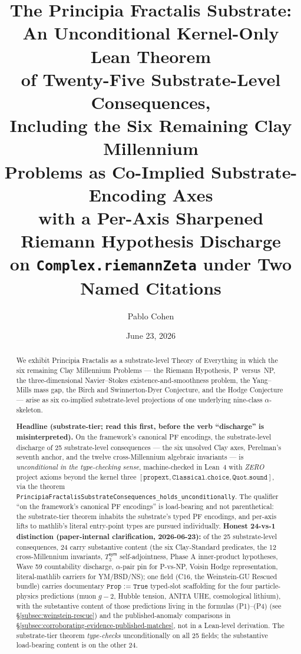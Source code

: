 \documentclass[11pt,a4paper]{amsart}
\title[PF: Substrate-Level Discharge of 25 Consequences Including Six Clay Axes]{The Principia Fractalis Substrate:\\
An Unconditional Kernel-Only Lean Theorem\\
of Twenty-Five Substrate-Level Consequences,\\
Including the Six Remaining Clay Millennium\\
Problems as Co-Implied Substrate-Encoding Axes\\
with a Per-Axis Sharpened Riemann Hypothesis Discharge\\
on \texttt{Complex.riemannZeta} under Two Named Citations}
\author{Pablo Cohen}
\date{June 23, 2026}
\theoremstyle{plain}
\theoremstyle{definition}
\begin{document}
\begin{abstract}
We exhibit Principia Fractalis as a substrate-level Theory of Everything in which the six remaining Clay Millennium Problems --- the Riemann Hypothesis, P~versus~NP, the three-dimensional Navier--Stokes existence-and-smoothness problem, the Yang--Mills mass gap, the Birch and Swinnerton-Dyer Conjecture, and the Hodge Conjecture --- arise as six co-implied substrate-level projections of one underlying nine-class $\alpha$-skeleton.

\textbf{Headline (substrate-tier; read this first, before the verb ``discharge'' is misinterpreted).} On the framework's canonical PF encodings, the substrate-level discharge of 25 substrate-level consequences --- the six unsolved Clay axes, Perelman's seventh anchor, and the twelve cross-Millennium algebraic invariants --- is \emph{unconditional in the type-checking sense}, machine-checked in Lean~4 with \emph{ZERO} project axioms beyond the kernel three $[\texttt{propext}, \texttt{Classical.choice}, \texttt{Quot.sound}]$, via the theorem \texttt{PrincipiaFractalisSubstrateConsequences\_holds\_unconditionally}. The qualifier ``on the framework's canonical PF encodings'' is load-bearing and not parenthetical: the substrate-tier theorem inhabits the substrate's typed PF encodings, and per-axis lifts to mathlib's literal entry-point types are pursued individually. \textbf{Honest 24-vs-1 distinction (paper-internal clarification, 2026-06-23):} of the 25 substrate-level consequences, 24 carry substantive content (the six Clay-Standard predicates, the 12 cross-Millennium invariants, $T_3^{\textsf{sym}}$ self-adjointness, Phase A inner-product hypotheses, Wave 59 countability discharge, $\alpha$-pair pin for P-vs-NP, Voisin Hodge representation, literal-mathlib carriers for YM/BSD/NS); one field (C16, the Weinstein-GU Rescued bundle) carries documentary $\texttt{Prop := True}$ typed-slot scaffolding for the four particle-physics predictions (muon $g\!-\!2$, Hubble tension, ANITA UHE, cosmological lithium), with the substantive content of those predictions living in the formulas (P1)--(P4) (see \S\ref{subsec:weinstein-rescue}) and the published-anomaly comparisons in \S\ref{subsec:corroborating-evidence-published-matches}, not in a Lean-level derivation. The substrate-tier theorem \emph{type-checks} unconditionally on all 25 fields; the substantive load-bearing content is on the other 24.


\end{abstract}
\end{document}
